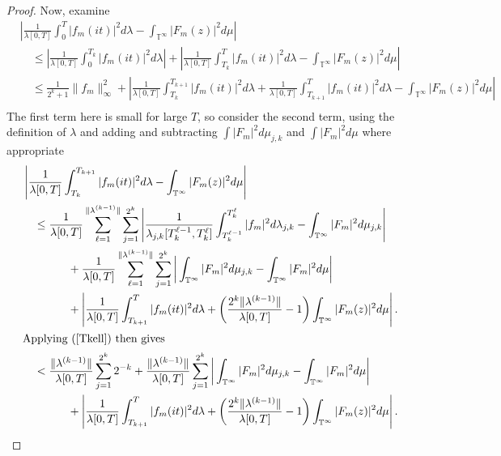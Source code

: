 \documentclass[]{elsarticle}
\newcommand{\T}{\mathbb{T}}
\numberwithin{equation}{section}
\begin{document}
\begin{proof}
      Now, examine
      \begin{align*}
        &\left|\frac{1}{\lambda[0,T]} \int_{0}^{T} |f_m(it)|^2 d\lambda-\int_{\T^{\infty}}|F_m(z)|^2d\mu\right|\nonumber\\
          &\quad\leq \left|\frac{1}{\lambda[0,T]} \int_{0}^{T_{k}} |f_m(it)|^2 d\lambda\right| + \left|\frac{1}{\lambda[0,T]} \int_{T_{k}}^{T} |f_m(it)|^2 d\lambda-\int_{\T^{\infty}}|F_m(z)|^2d\mu\right|\nonumber\\
          &\quad \leq \frac{1}{2^k+1}\|f_m\|^2_\infty + \left|\frac{1}{\lambda[0,T]} \int_{T_{k}}^{T_{k+1}} |f_m(it)|^2 d\lambda + \frac{1}{\lambda[0,T]} \int_{T_{k+1}}^{T} |f_m(it)|^2 d\lambda-\int_{\T^{\infty}}|F_m(z)|^2d\mu\right|\nonumber\\
      \end{align*}
      The first term here is small for large $T$, so consider the second term, using the definition of $\lambda$ and adding and subtracting $\int|F_m|^2d\mu_{j,k}$ and $\int|F_m|^2d\mu$ where appropriate
      \begin{align}
        &\left|\frac{1}{\lambda[0,T]} \int_{T_{k}}^{T_{k+1}} |f_m(it)|^2 d\lambda-\int_{\T^{\infty}}|F_m(z)|^2d\mu\right|\nonumber\\
          &\quad\leq \frac{1}{\lambda[0,T]} \sum_{\ell=1}^{\|\lambda^{(k-1)}\|}\sum_{j=1}^{2^{k}}\left|\frac{1}{\lambda_{j,k}[T_{k}^{\ell-1},T_{k}^{\ell}]}\int_{T_{k}^{\ell-1}}^{T_{k}^{\ell}}|f_m|^2d\lambda_{j,k} - \int_{\T^\infty}^{}|F_m|^2d\mu_{j,k}\right|\nonumber\\
            &\qquad \qquad+ \frac{1}{\lambda[0,T]} \sum_{\ell=1}^{\|\lambda^{(k-1)}\|}\sum_{j=1}^{2^{k}}\left|\,\int_{\T^{\infty}}^{}|F_m|^2d\mu_{j,k} -\int_{\T^\infty}^{}|F_m|^2d\mu\right|\nonumber\\ 
            &\qquad \qquad+ \left|\frac{1}{\lambda[0,T]} \int_{T_{k+1}}^{T} |f_m(it)|^2 d\lambda + \left(\frac{2^k\|\lambda^{(k-1)}\|}{\lambda[0,T]} -1\right)\int_{\T^{\infty}}|F_m(z)|^2d\mu\right|. \nonumber\\
        \intertext{Applying (\ref{Tkell}) then gives}
          &\quad < \frac{\|\lambda^{(k-1)}\|}{\lambda[0,T]}\sum_{j=1}^{2^{k}}2^{-k} + \frac{\|\lambda^{(k-1)}\|}{\lambda[0,T]} \sum_{j=1}^{2^{k}}\left|\,\int_{\T^{\infty}}^{}|F_m|^2d\mu_{j,k} -\int_{\T^\infty}^{}|F_m|^2d\mu\right| \nonumber\\ 
            &\qquad \qquad+ \left|\frac{1}{\lambda[0,T]} \int_{T_{k+1}}^{T} |f_m(it)|^2 d\lambda + \left(\frac{2^k\|\lambda^{(k-1)}\|}{\lambda[0,T]} -1\right)\int_{\T^{\infty}}|F_m(z)|^2d\mu\right|. \nonumber\\

\end{align}
\end{proof}
\end{document}
